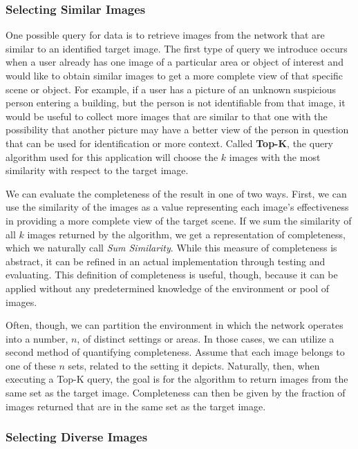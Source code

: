 \subsubsection{Selecting Similar Images}
One possible query for data is to retrieve images from the network that are similar to an identified target image.
The first type of query we introduce occurs when a user already has one image of a particular area or object of interest and would like to obtain similar images to get a more complete view of that specific scene or object.  
For example, if a user has a picture of an unknown suspicious person entering a building, but the person is not identifiable from that image, it would be useful to collect more images that are similar to that one with the possibility that another picture may have a better view of the person in question that can be used for identification or more context.  Called {\bf Top-K}, the query algorithm used for this application will choose the $k$ images with the most similarity with respect to the target image.  

We can evaluate the completeness of the result in one of two ways.  First, we can use the similarity of the images as a value representing each image's effectiveness in providing a more complete view of the target scene.  If we sum the similarity of all $k$ images returned by the algorithm, we get a representation of completeness, which we naturally call \emph{Sum Similarity}.  While this measure of completeness is abstract, it can be refined in an actual implementation through testing and evaluating.  This definition of completeness is useful, though, because it can be applied without any predetermined knowledge of the environment or pool of images.  

Often, though, we can partition the environment in which the network operates into a number, $n$, of distinct settings or areas.  In those cases, we can utilize a second method of quantifying completeness.  Assume that each image belongs to one of these $n$ sets, %
related to the setting it depicts.  Naturally, then, when executing a Top-K query, the goal is for the algorithm to return images from the same set as the target image.  Completeness can then be given by the fraction of images returned that are in the same set as the target image.

\subsubsection{Selecting Diverse Images}

